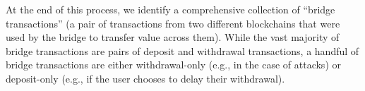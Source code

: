   At the end of this process, we identify a comprehensive collection
  of ``bridge transactions'' (a pair of transactions from two
  different blockchains that were used by the bridge to transfer
  value across them). While the vast majority of bridge transactions
  are pairs of deposit and withdrawal transactions, a handful of
  bridge transactions are either withdrawal-only (e.g., in the case of
  attacks) or deposit-only (e.g., if the user chooses to delay their
  withdrawal).











